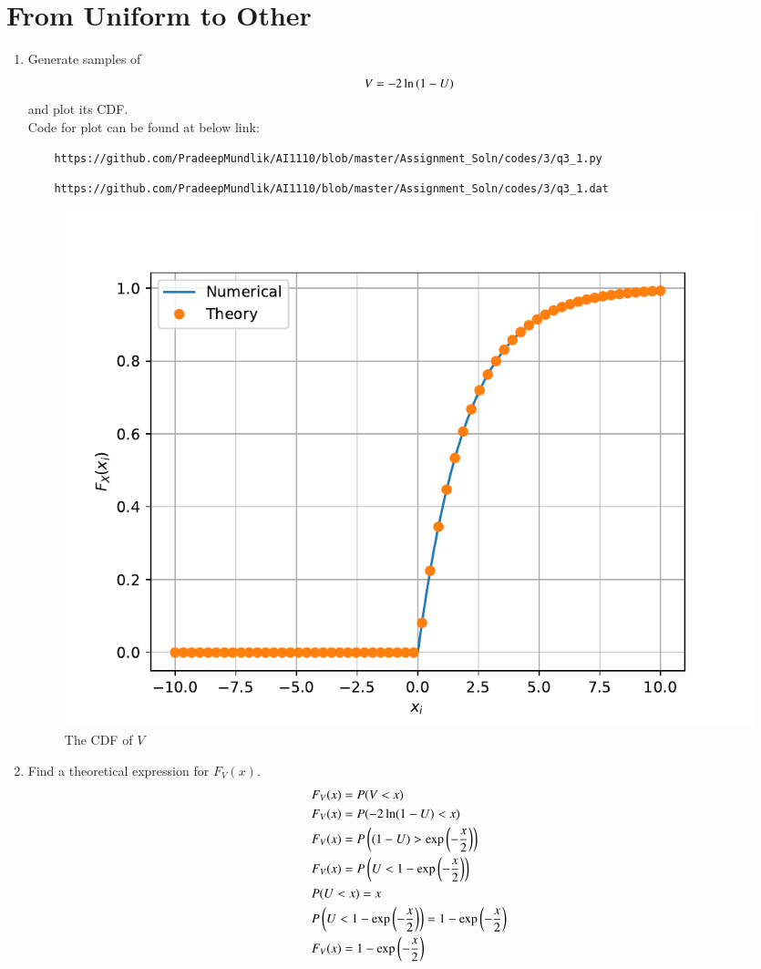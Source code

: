 \documentclass[journal,12pt,twocolumn]{IEEEtran}
\renewcommand\thesection{\arabic{section}}
\begin{document}
\section{From Uniform to Other}
\begin{enumerate}[label=\thesection.\arabic*
,ref=\thesection.\theenumi]
%
\item
Generate samples of 
%
\begin{equation}
V = -2\ln\left(1-U\right)
\end{equation}
%
and plot its CDF. \\
\solution 
Code for plot can be found at below link:
\begin{lstlisting}
	https://github.com/PradeepMundlik/AI1110/blob/master/Assignment_Soln/codes/3/q3_1.py
\end{lstlisting}
\begin{lstlisting}
	https://github.com/PradeepMundlik/AI1110/blob/master/Assignment_Soln/codes/3/q3_1.dat
\end{lstlisting}
\begin{figure}[h]
	\centering
	\includegraphics[width=\columnwidth]{figs/3/q3_1.pdf}
	\caption{The CDF of $V$}
	\label{fig:cdf_v}
	\end{figure}
\item Find a theoretical expression for $F_V(x)$. \\
\solution 
\begin{align}
	&F_V(x) = P(V < x) \\
	&F_V(x) = P(-2 \ln(1-U) < x) \\
	&F_V(x) = P\left((1-U) > \exp\left(-\frac{x}{2}\right)\right) \\
	&F_V(x) = P\left(U < 1 - \exp\left(-\frac{x}{2}\right)\right) \\
	&P(U < x) = x \\
	&P\left(U < 1 - \exp\left(-\frac{x}{2}\right)\right) = 1 - \exp\left(-\frac{x}{2}\right) \\
	&F_V(x) = 1 - \exp\left(-\frac{x}{2}\right)
\end{align}

%
\end{enumerate}
\end{document}
